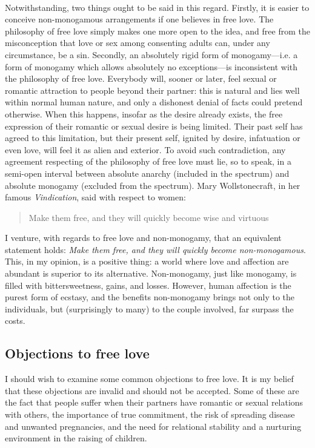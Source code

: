 \documentclass[a4paper, 12pt]{article}
\begin{document}
~ 

Notwithstanding, two things ought to be said in this regard. Firstly, it is
easier to conceive non-monogamous arrangements if one believes in free love.
The philosophy of free love simply makes one more open to the idea, and free
from the misconception that love or sex among consenting adults can, under any
circumstance, be a sin. Secondly, an absolutely rigid form of monogamy---i.e. a
form of monogamy which allows absolutely no exceptions---is inconsistent with
the philosophy of free love. Everybody will, sooner or later, feel sexual or
romantic attraction to people beyond their partner: this is natural and lies
well within normal human nature, and only a dishonest denial of
facts could pretend otherwise. When this happens, insofar as the desire already
exists, the free expression of their romantic or sexual desire is being
limited. Their past self has agreed to this limitation, but their present self,
ignited by desire, infatuation or even love, will feel it as alien and
exterior. To avoid such contradiction, any agreement respecting of the philosophy 
of free love must lie, so to speak, in a semi-open interval between absolute anarchy
(included in the spectrum) and absolute monogamy (excluded from the spectrum).
Mary Wollstonecraft, in her famous \textit{Vindication}, said with respect to
women:

\begin{quote}
    Make them free, and they will quickly become wise and virtuous
\end{quote}

I venture, with regards to free love and non-monogamy, that an equivalent
statement holds: \textit{Make them free, and they will quickly become non-monogamous}.
This, in my opinion, is a positive thing: a world where love and affection are
abundant is superior to its alternative. Non-monogamy, just like monogamy, is
filled with bittersweetness, gains, and losses. However, human affection is the
purest form of ecstasy, and the benefits non-monogamy brings not only to the
individuals, but (surprisingly to many) to the couple involved, far surpass the
costs.



\subsection{Objections to free love}


I should wish to examine some common objections to free love. It is my belief
that these objections are invalid and should not be accepted. Some of these are
the fact that people suffer when their partners have romantic or sexual
relations with others, the importance of true commitment, the risk of spreading
disease and unwanted pregnancies, and the need for relational stability and a
nurturing environment in the raising of children.
\end{document}
